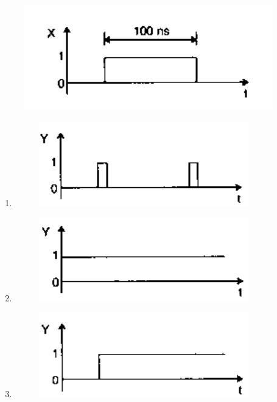 \newpage
\begin{figure}[!ht]
    \centering
    \includegraphics[scale=0.5]{GATE-yearwise/GATE(3)/figs/46q.png}
    \caption{}
    \label{fig:46q}
\end{figure}
\begin{enumerate}
    \item \begin{figure}[!ht]
         \centering
         \includegraphics[scale=0.4]{GATE-yearwise/GATE(3)/figs/46a.png}
         \end{figure}
    \item \begin{figure}[!ht]
         \centering
         \includegraphics[scale=0.4]{GATE-yearwise/GATE(3)/figs/46b.png}
         \end{figure}
    \item \begin{figure}[!ht]
         \centering
         \includegraphics[scale=0.4]{GATE-yearwise/GATE(3)/figs/46c.png}

\end{figure}
\end{enumerate}
